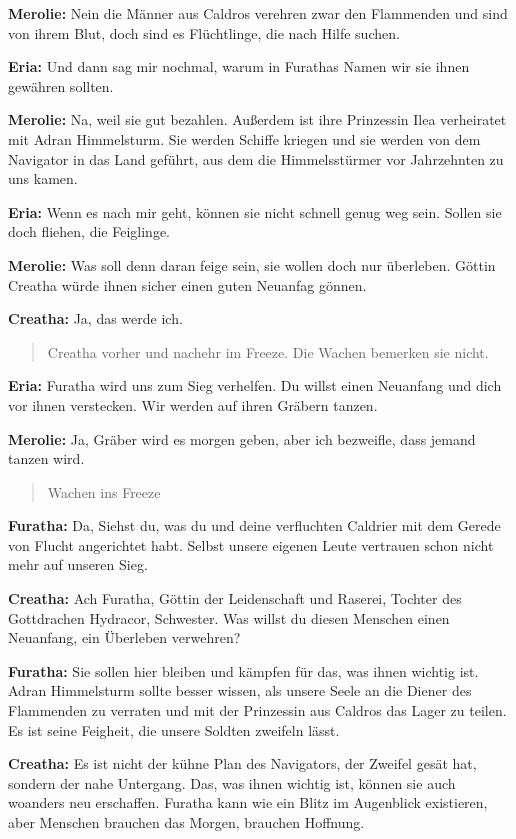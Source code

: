 \documentclass[a5paper,6pt]{book}
\begin{document}
\textbf{Merolie:} Nein die Männer aus Caldros verehren zwar den Flammenden und sind von ihrem
Blut, doch sind es Flüchtlinge, die nach Hilfe suchen.

\textbf{Eria:} Und dann sag mir nochmal, warum in Furathas Namen wir sie ihnen gewähren sollten.

\textbf{Merolie:} Na, weil sie gut bezahlen. Außerdem ist ihre Prinzessin Ilea verheiratet mit Adran
Himmelsturm. Sie werden Schiffe kriegen und sie werden von dem Navigator in das
Land geführt, aus dem die Himmelsstürmer vor Jahrzehnten zu uns kamen.

\textbf{Eria:} Wenn es nach mir geht, können sie nicht schnell genug weg sein. Sollen sie doch
fliehen, die Feiglinge.

\textbf{Merolie:} Was soll denn daran feige sein, sie wollen doch nur überleben. Göttin Creatha würde
ihnen sicher einen guten Neuanfag gönnen.

\textbf{Creatha:} Ja, das werde ich.

\begin{quote}
Creatha vorher und nachehr im Freeze. Die Wachen bemerken sie nicht.
\end{quote}

\textbf{Eria:} Furatha wird uns zum Sieg verhelfen. Du willst einen Neuanfang und dich vor ihnen
verstecken. Wir werden auf ihren Gräbern tanzen.

\textbf{Merolie:} Ja, Gräber wird es morgen geben, aber ich bezweifle, dass jemand tanzen wird.

\begin{quote}
Wachen ins Freeze
\end{quote}


\textbf{Furatha:} Da, Siehst du, was du und deine verfluchten Caldrier mit dem Gerede von Flucht
angerichtet habt. Selbst unsere eigenen Leute vertrauen schon nicht mehr auf unseren Sieg.

\textbf{Creatha:} Ach Furatha, Göttin der Leidenschaft und Raserei, Tochter des Gottdrachen
Hydracor, Schwester. Was willst du diesen Menschen einen Neuanfang, ein Überleben
verwehren?

\textbf{Furatha:} Sie sollen hier bleiben und kämpfen für das, was ihnen wichtig ist. Adran
Himmelsturm sollte besser wissen, als unsere Seele an die Diener des Flammenden zu
verraten und mit der Prinzessin aus Caldros das Lager zu teilen. Es ist seine Feigheit,
die unsere Soldten zweifeln lässt.

\textbf{Creatha:} Es ist nicht der kühne Plan des Navigators, der Zweifel gesät hat, sondern der nahe
Untergang. Das, was ihnen wichtig ist, können sie auch woanders neu erschaffen.
Furatha kann wie ein Blitz im Augenblick existieren, aber Menschen brauchen das
Morgen, brauchen Hoffnung.
\end{document}
